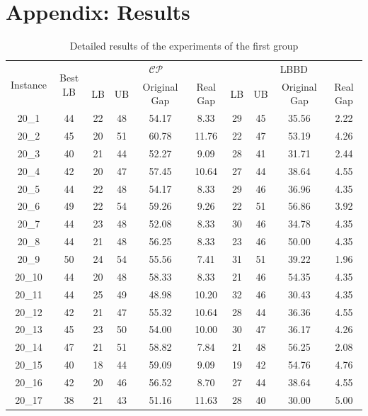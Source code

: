 \documentclass[a4paper,final]{article}
\begin{document}
\section*{Appendix: Results}
    \begin{longtable}[c]{cccccccccc}
\caption{Detailed results of the experiments of the first group}
\label{tab:results} \\
\multirow{2}{*}{Instance} & \multirow{2}{*}{Best LB} & \multicolumn{4}{c}{$\mathcal{CP}$} & \multicolumn{4}{c}{LBBD}           \\
                          &                          & LB & UB  & Original Gap & Real Gap & LB & UB  & Original Gap & Real Gap \\
\endfirsthead
%
\endhead
%
20\_1   & 44  & 22 & 48  & 54.17 & 8.33  & 29  & 45  & 35.56 & 2.22  \\
20\_2   & 45  & 20 & 51  & 60.78 & 11.76 & 22  & 47  & 53.19 & 4.26  \\
20\_3   & 40  & 21 & 44  & 52.27 & 9.09  & 28  & 41  & 31.71 & 2.44  \\
20\_4   & 42  & 20 & 47  & 57.45 & 10.64 & 27  & 44  & 38.64 & 4.55  \\
20\_5   & 44  & 22 & 48  & 54.17 & 8.33  & 29  & 46  & 36.96 & 4.35  \\
20\_6   & 49  & 22 & 54  & 59.26 & 9.26  & 22  & 51  & 56.86 & 3.92  \\
20\_7   & 44  & 23 & 48  & 52.08 & 8.33  & 30  & 46  & 34.78 & 4.35  \\
20\_8   & 44  & 21 & 48  & 56.25 & 8.33  & 23  & 46  & 50.00 & 4.35  \\
20\_9   & 50  & 24 & 54  & 55.56 & 7.41  & 31  & 51  & 39.22 & 1.96  \\
20\_10  & 44  & 20 & 48  & 58.33 & 8.33  & 21  & 46  & 54.35 & 4.35  \\
20\_11  & 44  & 25 & 49  & 48.98 & 10.20 & 32  & 46  & 30.43 & 4.35  \\
20\_12  & 42  & 21 & 47  & 55.32 & 10.64 & 28  & 44  & 36.36 & 4.55  \\
20\_13  & 45  & 23 & 50  & 54.00 & 10.00 & 30  & 47  & 36.17 & 4.26  \\
20\_14  & 47  & 21 & 51  & 58.82 & 7.84  & 21  & 48  & 56.25 & 2.08  \\
20\_15  & 40  & 18 & 44  & 59.09 & 9.09  & 19  & 42  & 54.76 & 4.76  \\
20\_16  & 42  & 20 & 46  & 56.52 & 8.70  & 27  & 44  & 38.64 & 4.55  \\
20\_17  & 38  & 21 & 43  & 51.16 & 11.63 & 28  & 40  & 30.00 & 5.00  \\

\end{longtable}
\end{document}
